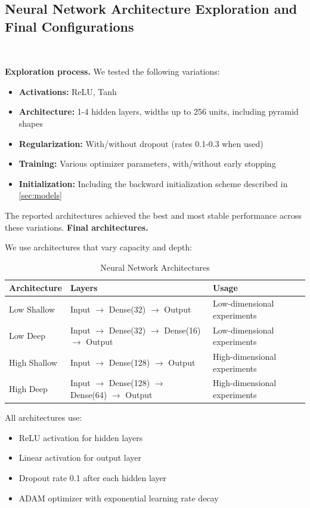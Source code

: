\documentclass[11pt,reqno,a4paper]{amsart}
\theoremstyle{definition}
\numberwithin{equation}{section}
\DeclareMathOperator{\1}{\mathbbm{1}}
\begin{document}
\subsection{Neural Network Architecture Exploration and Final Configurations}\label{app:networks}
\

\textbf{Exploration process.} We tested the following variations:
\begin{itemize}
  \item \textbf{Activations:} ReLU, Tanh
  \item \textbf{Architecture:} 1-4 hidden layers, widths up to 256 units, including pyramid shapes
  \item \textbf{Regularization:} With/without dropout (rates 0.1-0.3 when used)
  \item \textbf{Training:} Various optimizer parameters, with/without early stopping
  \item \textbf{Initialization:} Including the backward initialization scheme described in \cref{sec:models}
\end{itemize}
The reported architectures achieved the best and most stable performance across these variations.
\textbf{Final architectures.}

We use architectures that vary capacity and depth:
\begin{table}[h]
  \centering
  \caption{Neural Network Architectures}
  \begin{tabular}{lll}
    \toprule
    \textbf{Architecture} & \textbf{Layers}                         & \textbf{Usage}               \\
    \midrule
    Low Shallow           & Input $\to$ Dense(32) $\to$ Output              & Low-dimensional experiments  \\
    Low Deep              & Input $\to$ Dense(32) $\to$ Dense(16) $\to$ Output  & Low-dimensional experiments  \\
    High Shallow          & Input $\to$ Dense(128) $\to$ Output             & High-dimensional experiments \\
    High Deep             & Input $\to$ Dense(128) $\to$ Dense(64) $\to$ Output & High-dimensional experiments \\
    \bottomrule
  \end{tabular}
\end{table}

All architectures use:
\begin{itemize}
  \item ReLU activation for hidden layers
  \item Linear activation for output layer
  \item Dropout rate 0.1 after each hidden layer
  \item ADAM optimizer with exponential learning rate decay
\end{itemize}
\end{document}
